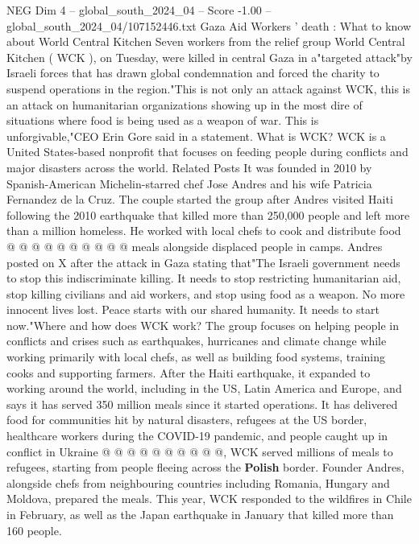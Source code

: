 \begin{textsample}{NEG Dim 4 – global\_south\_2024\_04 – Score -1.00 – global\_south\_2024\_04/107152446.txt}  \label{ex:f4_neg_195}
Gaza Aid Workers ' death : What to know about World Central Kitchen Seven workers from the relief group World Central Kitchen ( WCK ), on Tuesday, were killed in central Gaza in a"targeted attack"by Israeli forces that has drawn global condemnation and forced the charity to suspend operations in the region."This is not only an attack against WCK, this is an attack on humanitarian organizations showing up in the most dire of situations where food is being used as a weapon of war.
This is unforgivable,"CEO Erin Gore said in a statement.
What is WCK?
WCK is a United States-based nonprofit that focuses on feeding people during conflicts and major disasters across the world.
Related Posts It was founded in 2010 by Spanish-American Michelin-starred chef Jose Andres and his wife Patricia Fernandez de la Cruz.
The couple started the group after Andres visited Haiti following the 2010 earthquake that killed more than 250,000 people and left more than a million homeless.
He worked with local chefs to cook and distribute food @ @ @ @ @ @ @ @ @ @ meals alongside displaced people in camps.
Andres posted on X after the attack in Gaza stating that"The Israeli government needs to stop this indiscriminate killing.
It needs to stop restricting humanitarian aid, stop killing civilians and aid workers, and stop using food as a weapon.
No more innocent lives lost.
Peace starts with our shared humanity.
It needs to start now."Where and how does WCK work?
The group focuses on helping people in conflicts and crises such as earthquakes, hurricanes and climate change while working primarily with local chefs, as well as building food systems, training cooks and supporting farmers.
After the Haiti earthquake, it expanded to working around the world, including in the US, Latin America and Europe, and says it has served 350 million meals since it started operations.
It has delivered food for communities hit by natural disasters, refugees at the US border, healthcare workers during the COVID-19 pandemic, and people caught up in conflict in Ukraine @ @ @ @ @ @ @ @ @ @, WCK served millions of meals to refugees, starting from people fleeing across the \textbf{Polish} border.
Founder Andres, alongside chefs from neighbouring countries including Romania, Hungary and Moldova, prepared the meals.
This year, WCK responded to the wildfires in Chile in February, as well as the Japan earthquake in January that killed more than 160 people.

\end{textsample}
